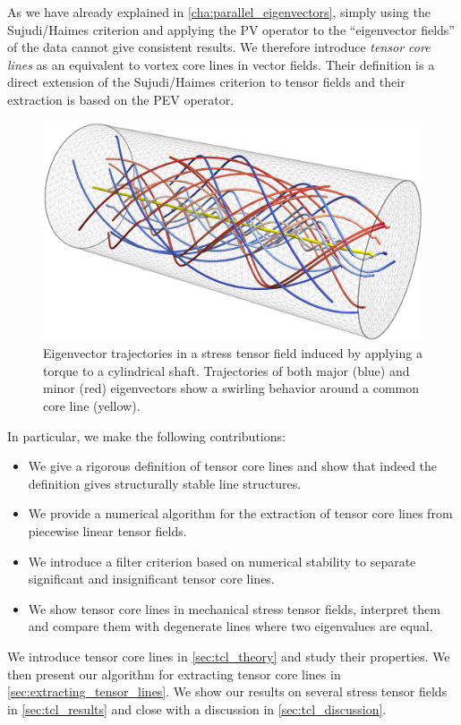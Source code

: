 %
As we have already explained in \cref{cha:parallel_eigenvectors}, simply using
the Sujudi/Haimes criterion and applying the \ac{PV} operator to the
``eigenvector fields'' of the data cannot give consistent results.
%
We therefore introduce \emph{tensor core lines} as an equivalent to vortex
core lines in vector fields.
%
Their definition is a direct extension of the Sujudi/Haimes criterion to tensor
fields and their extraction is based on the \ac{PEV} operator.
%
\begin{figure}[t]
    \centering
    \includegraphics[width=\columnwidth]{figures/torque_tube_lines.png}
    \caption{Eigenvector trajectories in a stress tensor field induced by
             applying a torque to a cylindrical shaft. Trajectories of both
             major (blue) and minor (red) eigenvectors show a swirling behavior
             around a common core line (yellow).
             }
    \label{fig:tube_lines}
\end{figure}
%
In particular, we make the following contributions:
%
\begin{itemize}
    \item  We give a rigorous definition of tensor core lines and show that
    indeed the definition gives structurally stable line structures.
    \item We provide a numerical algorithm for the extraction of tensor core
    lines from piecewise linear tensor fields.
    \item We introduce a filter criterion based on numerical stability to
    separate significant and insignificant tensor core lines.
    \item We show tensor core lines in mechanical stress tensor fields,
    interpret them and compare them with degenerate lines where two eigenvalues
    are equal.
\end{itemize}
%
We introduce tensor core lines in \cref{sec:tcl_theory} and study their
properties.
%
We then present our algorithm for extracting tensor core lines in
\cref{sec:extracting_tensor_lines}.
%
We show our results on several stress tensor fields in \cref{sec:tcl_results}
and close with a discussion in \cref{sec:tcl_discussion}.
%
%
